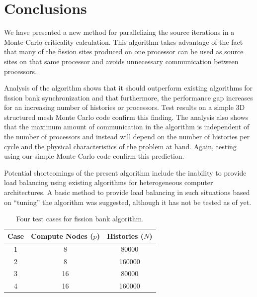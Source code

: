 \documentclass[11pt]{article}
\begin{document}
\section{Conclusions}
\label{sec:conclusions}

We have presented a new method for parallelizing the source iterations
in a Monte Carlo criticality calculation. This algorithm takes
advantage of the fact that many of the fission sites produced on one
processor can be used as source sites on that same processor and
avoids unnecessary communication between processors.

Analysis of the algorithm shows that it should outperform existing
algorithms for fission bank synchronization and that furthermore, the
performance gap increases for an increasing number of histories or
processors. Test results on a simple 3D structured mesh Monte Carlo
code confirm this finding. The analysis also shows that the maximum
amount of communication in the algorithm is independent of the number
of processors and instead will depend on the number of histories per
cycle and the physical characteristics of the problem at hand. Again,
testing using our simple Monte Carlo code confirm this prediction.

Potential shortcomings of the present algorithm include the inability
to provide load balancing using existing algorithms for heterogeneous
computer architectures. A basic method to provide load balancing in
such situations based on ``tuning'' the algorithm was suggested,
although it has not be tested as of yet.

\appendix

\pagebreak
\begin{singlespace}


\end{singlespace}

\clearpage
\begin{table}[ht]
  \centering
  \caption{Four test cases for fission bank algorithm.}
  \label{tab:cases}
  \begin{tabular}{|c|c|c|}
    \hline
    Case & Compute Nodes ($p$) & Histories ($N$) \\
    \hline
    1 & 8 & 80000 \\
    2 & 8 & 160000 \\
    3 & 16 & 80000 \\
    4 & 16 & 160000 \\
    \hline
  \end{tabular}
\end{table}
\end{document}
